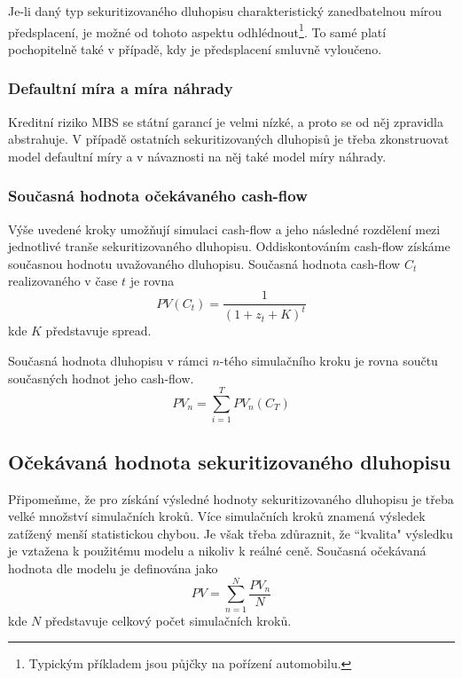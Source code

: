 \documentclass[a4paper]{book}
\begin{document}
Je-li daný typ sekuritizovaného dluhopisu charakteristický zanedbatelnou mírou předsplacení, je možné od tohoto aspektu odhlédnout\footnote{Typickým příkladem jsou půjčky na pořízení automobilu.}. To samé platí pochopitelně také v případě, kdy je předsplacení smluvně vyloučeno.

\subsubsection{Defaultní míra a míra náhrady}

Kreditní riziko MBS se státní garancí je velmi nízké, a proto se od něj zpravidla abstrahuje. V případě ostatních sekuritizovaných dluhopisů je třeba zkonstruovat model defaultní míry a v návaznosti na něj také model míry náhrady.

\subsubsection{Současná hodnota očekávaného cash-flow}

Výše uvedené kroky umožňují simulaci cash-flow a jeho následné rozdělení mezi jednotlivé tranše sekuritizovaného dluhopisu. Oddiskontováním cash-flow získáme současnou hodnotu uvažovaného dluhopisu. Současná hodnota cash-flow $C_t$ realizovaného v čase $t$ je rovna
\begin{equation}
PV(C_t) = \frac{1}{(1 + z_t + K)^t}
\end{equation}
kde $K$ představuje spread.

Současná hodnota dluhopisu v rámci $n$-tého simulačního kroku je rovna součtu současných hodnot jeho cash-flow.
\begin{equation*}
PV_n = \sum_{i=1}^T PV_n(C_T)
\end{equation*}

\subsection{Očekávaná hodnota sekuritizovaného dluhopisu}

Připomeňme, že pro získání výsledné hodnoty sekuritizovaného dluhopisu je třeba velké množství simulačních kroků. Více simulačních kroků znamená výsledek zatížený menší statistickou chybou. Je však třeba zdůraznit, že ``kvalita" výsledku je vztažena k použitému modelu a nikoliv k reálné ceně. Současná očekávaná hodnota dle modelu je definována jako
\begin{equation}
PV = \sum_{n=1}^N \frac{PV_n}{N}
\end{equation}
kde $N$ představuje celkový počet simulačních kroků.
\end{document}
